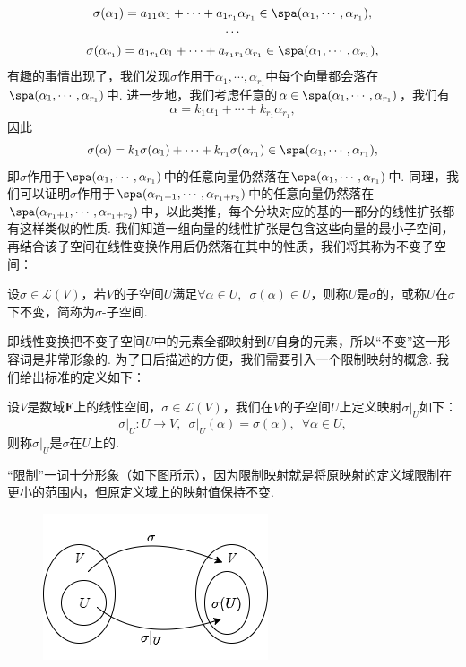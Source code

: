 \begin{gather*}
    \sigma(\alpha_1)=a_{11}\alpha_1+\cdots+a_{1r_1}\alpha_{r_1}\in \spa(\alpha_1,\cdots,\alpha_{r_1}),\\
    \cdots\\
    \sigma(\alpha_{r_1})=a_{1r_1}\alpha_1+\cdots+a_{r_1r_1}\alpha_{r_1}\in \spa(\alpha_1,\cdots,\alpha_{r_1}),
\end{gather*}
有趣的事情出现了，我们发现$\sigma$作用于$\alpha_1,\cdots,\alpha_{r_1}$中每个向量都会落在$\spa(\alpha_1,\cdots,\alpha_{r_1})$中. 进一步地，我们考虑任意的$\alpha\in\spa(\alpha_1,\cdots,\alpha_{r_1})$，我们有
\[\alpha=k_1\alpha_1+\cdots+k_{r_1}\alpha_{r_1},\]
因此
\[\sigma(\alpha)=k_1\sigma(\alpha_1)+\cdots+k_{r_1}\sigma(\alpha_{r_1})\in \spa(\alpha_1,\cdots,\alpha_{r_1}),\]
即$\sigma$作用于$\spa(\alpha_1,\cdots,\alpha_{r_1})$中的任意向量仍然落在$\spa(\alpha_1,\cdots,\alpha_{r_1})$中. 同理，我们可以证明$\sigma$作用于$\spa(\alpha_{r_1+1},\cdots,\alpha_{r_1+r_2})$中的任意向量仍然落在$\spa(\alpha_{r_1+1},\cdots,\alpha_{r_1+r_2})$中，以此类推，每个分块对应的基的一部分的线性扩张都有这样类似的性质. 我们知道一组向量的线性扩张是包含这些向量的最小子空间，再结合该子空间在线性变换作用后仍然落在其中的性质，我们将其称为不变子空间：
\begin{definition}{}{}
    设$\sigma\in \mathcal{L}(V)$，若$V$的子空间$U$满足$\forall \alpha\in U,\enspace \sigma(\alpha)\in U$，则称$U$是$\sigma$的，或称$U$在$\sigma$下不变，简称为$\sigma$-子空间.
\end{definition}

即线性变换把不变子空间$U$中的元素全都映射到$U$自身的元素，所以``不变''这一形容词是非常形象的. 为了日后描述的方便，我们需要引入一个限制映射的概念. 我们给出标准的定义如下：
\begin{definition}{}{} 
    设$V$是数域$\mathbf{F}$上的线性空间，$\sigma\in\mathcal{L}(V)$，我们在$V$的子空间$U$上定义映射$\sigma\vert_U$如下：
    \[\sigma\vert_U:U\to V,\enspace\sigma\vert_U(\alpha)=\sigma(\alpha),\enspace\forall \alpha\in U,\]
    则称$\sigma\vert_U$是$\sigma$在$U$上的.
\end{definition}

``限制''一词十分形象（如下图所示），因为限制映射就是将原映射的定义域限制在更小的范围内，但原定义域上的映射值保持不变.
\begin{figure}[H]
    \centering
    \includegraphics[scale=0.7]{figs/18-1.png}
\end{figure}

